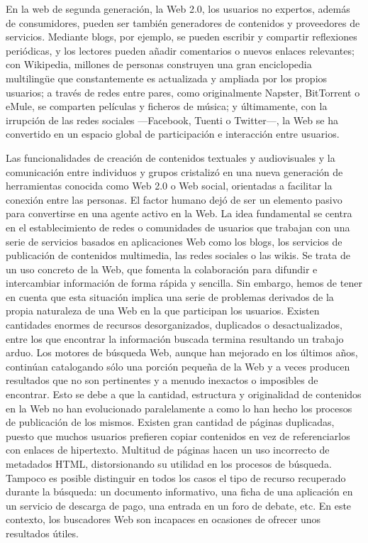 En la web de segunda generación, la Web 2.0, los usuarios no expertos, además de consumidores, pueden ser también generadores de contenidos y proveedores de servicios. Mediante blogs, por ejemplo, se pueden escribir y compartir reflexiones periódicas, y los lectores pueden añadir comentarios o nuevos enlaces relevantes; con Wikipedia, millones de personas construyen una gran enciclopedia multilingüe que constantemente es actualizada y ampliada por los propios usuarios; a través de redes entre pares, como originalmente Napster, BitTorrent o eMule, se comparten películas y ficheros de música; y últimamente, con la irrupción de las redes sociales —Facebook, Tuenti o Twitter—, la Web se ha convertido en un espacio global de participación e interacción entre usuarios.

Las funcionalidades de creación de contenidos textuales y audiovisuales y la comunicación entre individuos y grupos cristalizó en una nueva generación de herramientas conocida como Web 2.0 o Web social, orientadas a facilitar la conexión entre las personas. El factor humano dejó de ser un elemento pasivo para convertirse en una agente activo en la Web. La idea fundamental se centra en el establecimiento de redes o comunidades de usuarios que trabajan con una serie de servicios basados en aplicaciones Web como los blogs, los servicios de publicación de contenidos multimedia, las redes sociales o las wikis. Se trata de un uso concreto de la Web, que fomenta la colaboración para difundir e intercambiar información de forma rápida y sencilla. Sin embargo, hemos de tener en cuenta que esta situación implica una serie de problemas derivados de la propia naturaleza de una Web en la que participan los usuarios. Existen cantidades enormes de recursos desorganizados, duplicados o desactualizados, entre los que encontrar la información buscada termina resultando un trabajo arduo. Los motores de búsqueda Web, aunque han mejorado en los últimos años, continúan catalogando sólo una porción pequeña de la Web y a veces producen resultados que no son pertinentes y a menudo inexactos o imposibles de encontrar. Esto se debe a que la cantidad, estructura y originalidad de contenidos en la Web no han evolucionado paralelamente a como lo han hecho los procesos de publicación de los mismos. Existen gran cantidad de páginas duplicadas, puesto que muchos usuarios prefieren copiar contenidos en vez de referenciarlos con enlaces de hipertexto. Multitud de páginas hacen un uso incorrecto de metadados HTML, distorsionando su utilidad en los procesos de búsqueda. Tampoco es posible distinguir en todos los casos el tipo de recurso recuperado durante la búsqueda: un documento informativo, una ficha de una aplicación en un servicio de descarga de pago, una entrada en un foro de debate, etc. En este contexto, los buscadores Web son incapaces en ocasiones de ofrecer unos resultados útiles. 


